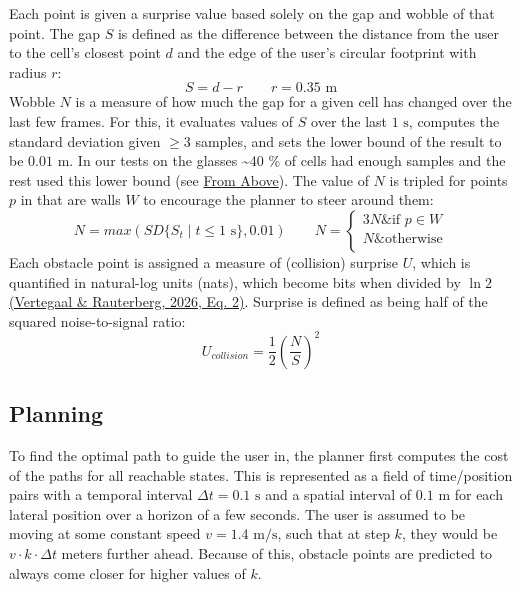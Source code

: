 \documentclass[a4paper]{article}
\begin{document}
Each point is given a surprise value based solely on the gap and wobble of that point. The gap $S$ is defined as the difference between the distance from the user to the cell's closest point $d$ and the edge of the user's circular footprint with radius $r$:
$$
S=d-r \qquad r=0.35 \text{ m}
$$
Wobble $N$ is a measure of how much the gap for a given cell has changed over the last few frames. For this, it evaluates values of $S$ over the last $1 \text{ s}$, computes the standard deviation given $\ge 3$ samples, and sets the lower bound of the result to be $0.01 \text{ m}$. In our tests on the glasses \textasciitilde 40 \% of cells had enough samples and the rest used this lower bound (see \hyperref[panel-from-above]{From Above}). The value of $N$ is tripled for points $p$ in that are walls $W$ to encourage the planner to steer around them:
$$
N=max(SD\{S_{t} \mid t \le 1 \text{ s}\}, 0.01) 
\qquad
N = 
     \begin{cases}
       3N \& \text{if } p \in W \\
       N \&\text{otherwise} \\ 
     \end{cases}
$$
Each obstacle point is assigned a measure of (collision) surprise $U$, which is quantified in natural-log units (nats), which become bits when divided by $\ln 2$ \hyperref[references]{(Vertegaal \& Rauterberg, 2026, Eq. 2)}. Surprise is defined as being half of the squared noise-to-signal ratio:
$$
U_{collision} = \frac{1}{2} \left( \frac{N}{S} \right)^2
$$

\subsection{Planning} \label{planning}
To find the optimal path to guide the user in, the planner first computes the cost of the paths for all reachable states. This is represented as a field of time/position pairs with a temporal interval $\Delta t = 0.1\text{ s}$ and a spatial interval of $0.1 \text{ m}$ for each lateral position over a horizon of a few seconds. The user is assumed to be moving at some constant speed $v = 1.4 \text{ m/s}$, such that at step $k$, they would be $v\cdot k\cdot \Delta t$ meters further ahead. Because of this, obstacle points are predicted to always come closer for higher values of $k$. 
\end{document}
